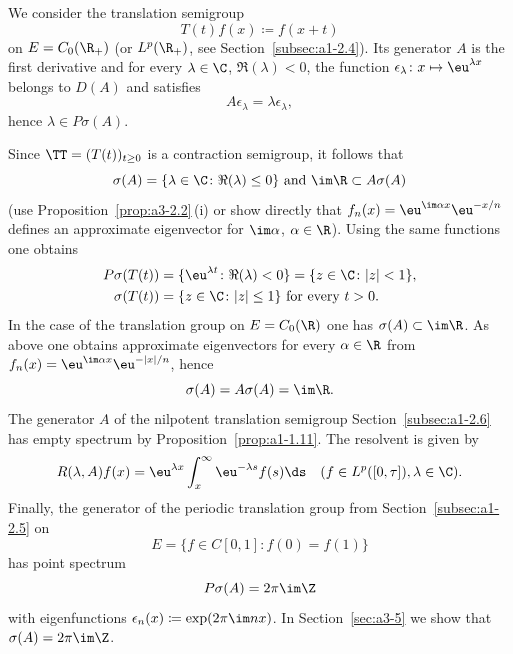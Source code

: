 \begin{example}\label{ex:a3-2.4}

We consider the translation semigroup
\[
T(t)f(x) \coloneqq f(x+t)
\]
on $E = C_{0}(\R_{+})$ (or $L^{p}(\R_{+})$, see Section~\ref{subsec:a1-2.4}).
Its generator $A$ is the first derivative and for every $\lambda \in \C$, $\Re(\lambda) < 0$, the function $\epsilon_{\lambda} \colon x \mapsto \eu^{\lambda x}$ belongs to $D(A)$ and satisfies
\[
A\epsilon_{\lambda} = \lambda\epsilon_{\lambda} ,
\]
hence $\lambda \in P\sigma(A)$.

Since $\TT = (T(t))_{t \geq 0}$ is a contraction semigroup, it follows that 
%
\[
	 \text{$\sigma(A) = \{\lambda \in \C \colon \Re(\lambda) \leq 0\}$  and $\im\R \subset A\sigma(A)$}  
\]
%
(use Proposition~\ref{prop:a3-2.2}\,(i) or show directly that $f_{n}(x) = \eu^{ \im\alpha x}\eu^{-x/n}$ defines an approximate eigenvector for $\im\alpha$, $\alpha \in \R$).
Using the same functions one obtains
\begin{align*}
	P\sigma(T(t)) &= \{\eu^{\lambda t} \colon \Re(\lambda) < 0\} = \{z \in \C \colon |z| < 1\} ,\\
	\sigma(T(t)) &= \{z \in \C \colon |z| \leq 1\} \text{ for every } t > 0 .
\end{align*}
In the case of the translation group on $E = C_{0}(\R)$ one has $\sigma(A) \subset \im\R$.
As above one obtains approximate eigenvectors for every $\alpha \in \R$ from 
$f_{n}(x) = \eu^{\im\alpha x}\eu^{-|x|/n}$, hence
\[
\sigma(A) = A\sigma(A) = \im\R .
\]
The generator $A$ of the nilpotent translation semigroup Section~\ref{subsec:a1-2.6} has empty spectrum by Proposition~\ref{prop:a1-1.11}.
The resolvent is given by
\[
R(\lambda,A)f(x) = \eu^{\lambda x}\int_{x}^{\infty}\eu^{-\lambda s}f(s)  \ds \quad (f \in L^{p}([0,\tau]), \lambda \in \C) .
\]
Finally, the generator of the periodic translation group from Section~\ref{subsec:a1-2.5} on
\[
	E = \{f \in C[0,1] \colon f(0) = f(1)\}
\]
%
has point spectrum
\[
P\sigma(A) = 2\pi \im\Z
\]
with eigenfunctions $\epsilon_{n}(x) \coloneqq \exp(2\pi \im n x)$.
In Section~\ref{sec:a3-5} we show that $\sigma(A) = 2\pi \im\Z$.
\end{example}
